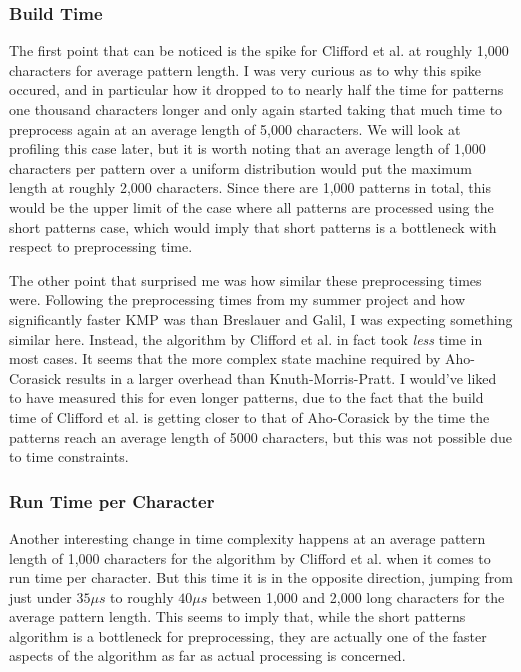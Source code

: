 \documentclass[ %
                    author={Dominic Joseph Moylett},
                    degree={MEng},
                     title={Dictionary Matching with Fingerprints},
                  subtitle={An Empirical Analysis},
                      type={research},
                      year={2015} ]{dissertation}
\begin{document}
\subsubsection{Build Time}

The first point that can be noticed is the spike for Clifford et al. at roughly 1,000 characters for average pattern length. I was very curious as to why this spike occured, and in particular how it dropped to to nearly half the time for patterns one thousand characters longer and only again started taking that much time to preprocess again at an average length of 5,000 characters. We will look at profiling this case later, but it is worth noting that an average length of 1,000 characters per pattern over a uniform distribution would put the maximum length at roughly 2,000 characters. Since there are 1,000 patterns in total, this would be the upper limit of the case where all patterns are processed using the short patterns case, which would imply that short patterns is a bottleneck with respect to preprocessing time.

The other point that surprised me was how similar these preprocessing times were. Following the preprocessing times from my summer project and how significantly faster KMP was than Breslauer and Galil, I was expecting something similar here. Instead, the algorithm by Clifford et al. in fact took \textit{less} time in most cases. It seems that the more complex state machine required by Aho-Corasick results in a larger overhead than Knuth-Morris-Pratt. I would've liked to have measured this for even longer patterns, due to the fact that the build time of Clifford et al. is getting closer to that of Aho-Corasick by the time the patterns reach an average length of 5000 characters, but this was not possible due to time constraints.

\subsubsection{Run Time per Character}

Another interesting change in time complexity happens at an average pattern length of 1,000 characters for the algorithm by Clifford et al. when it comes to run time per character. But this time it is in the opposite direction, jumping from just under $35\mu s$ to roughly $40\mu s$ between 1,000 and 2,000 long characters for the average pattern length. This seems to imply that, while the short patterns algorithm is a bottleneck for preprocessing, they are actually one of the faster aspects of the algorithm as far as actual processing is concerned.
\end{document}
